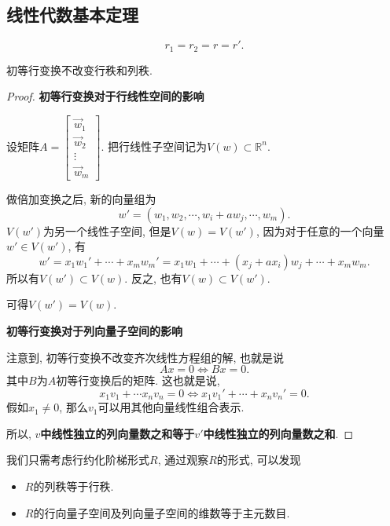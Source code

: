 \subsection{线性代数基本定理}
\begin{theorem}
    \begin{equation}
      r_1=r_2=r=r'.
    \end{equation}
\end{theorem}
\begin{proposition}
    初等行变换不改变行秩和列秩.
\end{proposition}
\begin{proof}
 
    \textbf{初等行变换对于行线性空间的影响}

    设矩阵$A = \begin{bmatrix} 
    \vec{w}_1 \\ 
    \vec{w}_2 \\ 
    \vdots \\ 
    \vec{w}_m 
    \end{bmatrix}$.
    把行线性子空间记为$V(w) \subset \mathbb{R}^{n}$.

    做倍加变换之后, 新的向量组为
    \begin{equation}
      w' = (w_1,w_2,\cdots,w_i+a w_j ,\cdots,w_m).
    \end{equation}
    $V(w')$为另一个线性子空间, 但是$V(w)=V(w')$, 因为对于任意的一个向量$w' \in V(w')$, 有
    \begin{equation}
      w'=x_1w_1'+ \cdots +x_m w_m' = x_1 w_1 + \cdots +(x_j+ ax_i)w_j+ \cdots +x_m w_m.
    \end{equation}
    所以有$V(w') \subset V(w)$. 反之, 也有$V(w) \subset V(w')$.

    可得$V(w')=V(w)$.

    \textbf{初等行变换对于列向量子空间的影响}

    注意到, 初等行变换不改变齐次线性方程组的解, 也就是说
    \begin{equation}
      Ax=0 \iff Bx=0.
    \end{equation}
    其中$B$为$A$初等行变换后的矩阵. 这也就是说, 
    \begin{equation}
      x_1v_1+ \cdots x_n v_n=0 \iff x_1 v_1' + \cdots +x_n v_n ' = 0.
    \end{equation}
    假如$x_1\neq 0$, 那么$v_1$可以用其他向量线性组合表示.

    所以, \textbf{$v$中线性独立的列向量数之和等于$v'$中线性独立的列向量数之和}.

\end{proof}

我们只需考虑行约化阶梯形式$R$, 通过观察$R$的形式, 可以发现
\begin{itemize}
    \item $R$的列秩等于行秩.
    
    \item $R$的行向量子空间及列向量子空间的维数等于主元数目.
\end{itemize}


